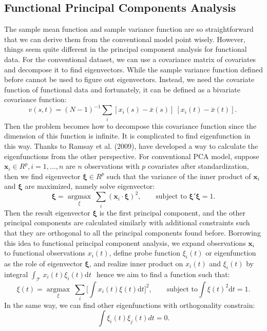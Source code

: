\subsection{Functional Principal Components Analysis}
The sample mean function and sample variance function are so straightforward that we can derive them from the conventional model point wisely. However, things seem quite different in the principal component analysis for functional data. For the conventional dataset, we can use a covariance matrix of covariates and decompose it to find eigenvectors. While the sample variance function defined before cannot be used to figure out eigenvectors. Instead, we need the covariate function of functional data and fortunately, it can be defined as a bivariate covariance function:\\
$$v\left(s,t\right)=\left(N-1\right)^{-1}\sum_{i}{\left[x_i\left(s\right)-\bar{x}\left(s\right)\right]\ \left[x_i\left(t\right)-\bar{x}\left(t\right)\right].\ }$$
Then the problem becomes how to decompose this covariance function since the dimension of this function is infinite. It is complicated to find eigenfunction in this way. Thanks to Ramsay et al. (2009), have developed a way to calculate the eigenfunctions from the other perspective. For conventional PCA model, suppose $\bm x_{i}\in R^p, i=1,\dots,n$ are $n$ observations with $p$ covariates after standardization, then we find eigenvector $\bm\xi \in R^p$ such that the variance of the inner product of $\bm x_{i}$ and $\bm \xi$ are maximized, namely solve eigenvector:\\
$$\bm{\xi}=\mathop{\arg\max}\limits_{\xi}\ \sum_{i}\left(\bm{x}_i\cdot\bm{\xi}\right)^2, \qquad \text{subject to  }  \bm \xi' \bm \xi = 1.$$
Then the result eigenvector $\bm \xi$  is the first principal component, and the other principal components are calculated similarly with additional constraints such that they are orthogonal to all the principal components found before. Borrowing this idea to functional principal component analysis, we expand observations $\bm x_{i}$ to functional observations $x_{i}(t)$, define probe function $\xi_{i}(t)$ or eigenfunction as the role of eigenvector $\bm \xi$, and realize inner product on $x_{i}(t)$ and $\xi_{i}(t)$ by integral $\int_{\mathcal{T}\ }{x_i\left(t\right)\xi_i\left(t\right)\mathrm{d}t}\,\ $ hence we aim to find a function such that:\\
$$\xi\left(t\right)=\mathop{\arg\max}\limits_{\xi}\ \sum_{i}[\int{x_i\left(t\right)\xi\left(t\right)\mathrm{d}t]^2},\qquad \text{subject to} \int\xi(t)^2\mathrm{d}t = 1. $$
In the same way, we can find other eigenfunctions with orthogonality constrain:\\
$$\int{\xi_i\left(t\right)\xi_j\left(t\right)dt}=0.$$

